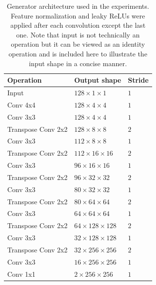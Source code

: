 \begin{table}[t]
    \centering
    \caption{Generator architecture used in the experiments. Feature normalization and leaky ReLUs were applied after each convolution except the last one. Note that input is not technically an operation but it can be viewed as an identity operation and is included here to illustrate the input shape in a concise manner.}
    \label{tab:generator}
    \begin{tabular}{|lll|}
        \hline
        Operation          & Output shape     & Stride \\ \hline
        Input              & $128\times1\times1$   &$1$     \\
        Conv 4x4           & $128\times4\times4$   &$1$     \\
        Conv 3x3           & $128\times4\times4$   &$1$     \\ \hline
        Transpose Conv 2x2 & $128\times8\times8$   &$2$     \\
        Conv 3x3           & $112\times8\times8$   &$1$     \\ \hline
        Transpose Conv 2x2 & $112\times16\times16$   &$2$     \\
        Conv 3x3           & $96\times16\times16$   &$1$     \\ \hline
        Transpose Conv 2x2 & $96\times32\times32$   &$2$     \\
        Conv 3x3           & $80\times32\times32$   &$1$     \\ \hline
        Transpose Conv 2x2 & $80\times64\times64$   &$2$     \\
        Conv 3x3           & $64\times64\times64$   &$1$     \\ \hline
        Transpose Conv 2x2 & $64\times128\times128$   &$2$     \\
        Conv 3x3           & $32\times128\times128$   &$1$     \\ \hline
        Transpose Conv 2x2 & $32\times256\times256$   &$2$     \\
        Conv 3x3           & $16\times256\times256$   &$1$     \\ \hline
        Conv 1x1           & $2\times256\times256$ &$1$       \\ \hline
    \end{tabular}
\end{table}

